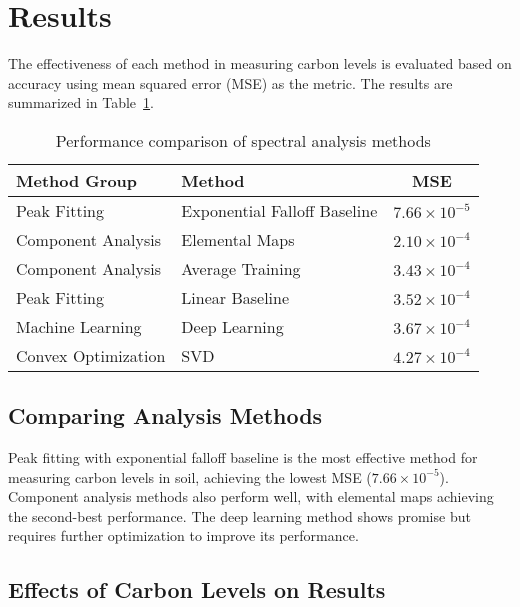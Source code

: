 \section{Results}

The effectiveness of each method in measuring carbon levels is evaluated based on accuracy using mean squared error (MSE) as the metric. The results are summarized in Table~\ref{tab:results}.

\begin{table}[H]
\centering
\caption{Performance comparison of spectral analysis methods}
\label{tab:results}
\begin{tabular}{llc}
\toprule
Method Group & Method & MSE \\
\midrule
Peak Fitting & Exponential Falloff Baseline & $7.66 \times 10^{-5}$ \\
Component Analysis & Elemental Maps & $2.10 \times 10^{-4}$ \\
Component Analysis & Average Training & $3.43 \times 10^{-4}$ \\
Peak Fitting & Linear Baseline & $3.52 \times 10^{-4}$ \\
Machine Learning & Deep Learning & $3.67 \times 10^{-4}$ \\
Convex Optimization & SVD & $4.27 \times 10^{-4}$ \\
\bottomrule
\end{tabular}
\end{table}

\subsection{Comparing Analysis Methods}

Peak fitting with exponential falloff baseline is the most effective method for measuring carbon levels in soil, achieving the lowest MSE ($7.66 \times 10^{-5}$). Component analysis methods also perform well, with elemental maps achieving the second-best performance. The deep learning method shows promise but requires further optimization to improve its performance.

\subsection{Effects of Carbon Levels on Results}

